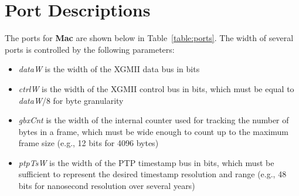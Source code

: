 \section{Port Descriptions}

The ports for \textbf{Mac} are shown below in
Table~\ref{table:ports}. The width of several ports is controlled
by the following parameters:

\begin{itemize}[noitemsep]
  \item \textit{dataW} is the width of the XGMII data bus in bits
  \item \textit{ctrlW} is the width of the XGMII control bus in bits, which must be equal to \textit{dataW}/8 for byte granularity
  \item \textit{gbxCnt} is the width of the internal counter used for tracking the number of bytes in a frame, which must be wide enough to count up to the maximum frame size (e.g., 12 bits for 4096 bytes)
  \item \textit{ptpTsW} is the width of the PTP timestamp bus in bits, which must be sufficient to represent the desired timestamp resolution and range (e.g., 48 bits for nanosecond resolution over several years)
  
\end{itemize}

